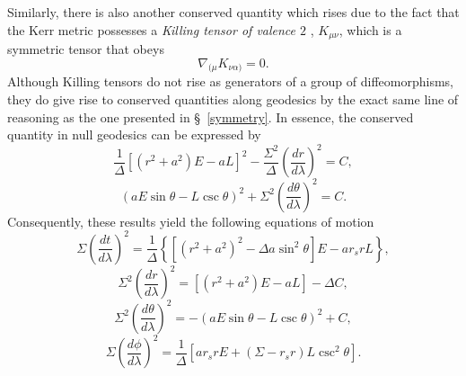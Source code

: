 \documentclass[
12pt,		%
openright,	%
twoside,  %
a4paper,			%
chapter=TITLE,		%
english,			%
french,				%
spanish,			%
brazil				%
]{USPSC-classe/USPSC}
\begin{document}
\begin{apendicesenv}
Similarly, there is also another conserved quantity which rises due to the fact that the Kerr metric possesses a \textit{Killing tensor of valence $2$} \cite{Walker1970}, $K_{\mu\nu}$, which is a symmetric tensor that obeys \cite{Wald1984}
\begin{equation}
    \nabla_{(\mu}K_{\nu\alpha)}=0.
\end{equation}
Although Killing tensors do not rise as generators of a group of diffeomorphisms, they do give rise to conserved quantities along geodesics by the exact same line of reasoning as the one presented in \S~\ref{symmetry}. In essence, the conserved quantity in null geodesics can be expressed by
\begin{equation}
    \frac{1}{\Delta}\left[(r^2+a^2)E-aL\right]^2-\frac{\Sigma^2}{\Delta}\left(\frac{dr}{d\lambda}\right)^2=C,
\end{equation}
\begin{equation}
    (aE\sin{\theta}-L\csc{\theta})^2+\Sigma^2\left(\frac{d\theta}{d\lambda}\right)^2=C.
\end{equation}
Consequently, these results yield the following equations of motion
\begin{equation}
    \Sigma\left(\frac{dt}{d\lambda}\right)^2=\frac{1}{\Delta}\left\{\left[(r^2+a^2)^2-\Delta a\sin^2{\theta}\right]E-ar_srL\right\},
\end{equation}
\begin{equation}
    \Sigma^2\left(\frac{dr}{d\lambda}\right)^2=\left[(r^2+a^2)E-aL\right]-\Delta C,
\end{equation}
\begin{equation}
    \Sigma^2\left(\frac{d\theta}{d\lambda}\right)^2=-\left(aE\sin{\theta}-L\csc{\theta}\right)^2+C,
\end{equation}
\begin{equation}
    \Sigma\left(\frac{d\phi}{d\lambda}\right)^2=\frac{1}{\Delta}\left[ar_srE+(\Sigma-r_sr)L\csc^2{\theta}\right].
\end{equation}


\end{apendicesenv}
\end{document}
